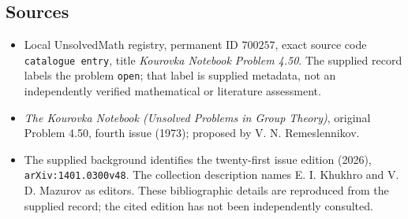 \documentclass[11pt]{article}
\begin{document}
\subsection{Sources}
\begin{itemize}
\item Local UnsolvedMath registry, permanent ID \(700257\), exact source code \texttt{catalogue entry}, title \emph{Kourovka Notebook Problem 4.50}. The supplied record labels the problem \texttt{open}; that label is supplied metadata, not an independently verified mathematical or literature assessment.
\item \emph{The Kourovka Notebook (Unsolved Problems in Group Theory)}, original Problem 4.50, fourth issue (1973); proposed by V. N. Remeslennikov.
\item The supplied background identifies the twenty-first issue edition (2026), \texttt{arXiv:1401.0300v48}. The collection description names E. I. Khukhro and V. D. Mazurov as editors. These bibliographic details are reproduced from the supplied record; the cited edition has not been independently consulted.
\end{itemize}
\end{document}
